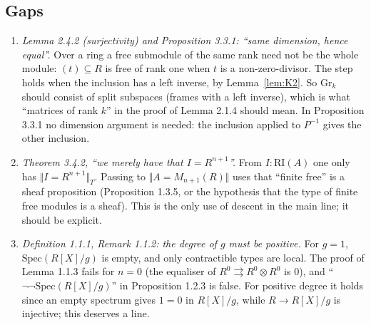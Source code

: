 \documentclass[11pt]{amsart}
\theoremstyle{definition}
\theoremstyle{remark}
\newcommand{\RI}{\mathrm{RI}}
\newcommand{\tr}[1]{\Vert #1\Vert}
\newcommand{\trT}[1]{\Vert #1\Vert_T}
\begin{document}
\subsection*{Gaps}
\begin{enumerate}
\item \emph{Lemma 2.4.2 (surjectivity) and Proposition 3.3.1: ``same
  dimension, hence equal''.} Over a ring a free submodule of the same rank
  need not be the whole module: $(t)\subseteq R$ is free of rank one when
  $t$ is a non-zero-divisor. The step holds when the inclusion has a left
  inverse, by Lemma~\ref{lem:K2}. So $\mathrm{Gr}_k$ should consist of
  split subspaces (frames with a left inverse), which is what ``matrices of
  rank $k$'' in the proof of Lemma 2.1.4 should mean. In Proposition 3.3.1
  no dimension argument is needed: the inclusion applied to $P^{-1}$ gives
  the other inclusion.
\item \emph{Theorem 3.4.2, ``we merely have that $I=R^{n+1}$''.} From
  $I:\RI(A)$ one only has $\trT{I=R^{n+1}}$. Passing to $\tr{A=M_{n+1}(R)}$
  uses that ``finite free'' is a sheaf proposition (Proposition 1.3.5, or the
  hypothesis that the type of finite free modules is a sheaf). This is the
  only use of descent in the main line; it should be explicit.
\item \emph{Definition 1.1.1, Remark 1.1.2: the degree of $g$ must be
  positive.} For $g=1$, $\mathrm{Spec}(R[X]/g)$ is empty, and only
  contractible types are local. The proof of Lemma 1.1.3 fails for
  $n=0$ (the equaliser of $R^0\rightrightarrows R^0\otimes R^0$ is $0$), and
  ``$\neg\neg\mathrm{Spec}(R[X]/g)$'' in Proposition 1.2.3 is false. For
  positive degree it holds since an empty spectrum gives $1=0$ in
  $R[X]/g$, while $R\to R[X]/g$ is injective; this deserves a line.
\end{enumerate}
\end{document}
